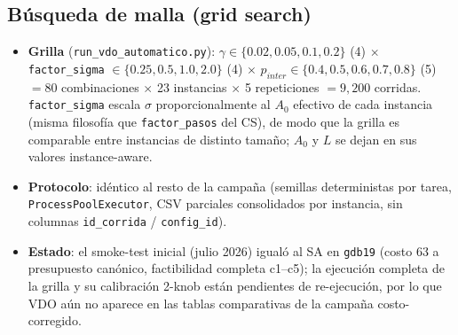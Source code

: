 \subsection{Búsqueda de malla (grid search)}
\begin{itemize}
  \item \textbf{Grilla} (\texttt{run\_vdo\_automatico.py}):
    $\gamma \in \{0.02, 0.05, 0.1, 0.2\}$ (4) $\times$
    \texttt{factor\_sigma} $\in \{0.25, 0.5, 1.0, 2.0\}$ (4) $\times$
    $p_{inter} \in \{0.4, 0.5, 0.6, 0.7, 0.8\}$ (5)
    $= 80$ combinaciones $\times$ 23 instancias $\times$ 5 repeticiones
    $= 9{,}200$ corridas. \texttt{factor\_sigma} escala $\sigma$
    proporcionalmente al $A_0$ efectivo de cada instancia (misma filosofía
    que \texttt{factor\_pasos} del CS), de modo que la grilla es comparable
    entre instancias de distinto tamaño; $A_0$ y $L$ se dejan en sus valores
    instance-aware.
  \item \textbf{Protocolo}: idéntico al resto de la campaña (semillas
    deterministas por tarea, \texttt{ProcessPoolExecutor}, CSV parciales
    consolidados por instancia, sin columnas \texttt{id\_corrida} /
    \texttt{config\_id}).
  \item \textbf{Estado}: el smoke-test inicial (julio 2026) igualó al SA en
    \texttt{gdb19} (costo 63 a presupuesto canónico, factibilidad completa
    c1--c5); la ejecución completa de la grilla y su calibración 2-knob están
    pendientes de re-ejecución, por lo que VDO aún no aparece en las tablas
    comparativas de la campaña costo-corregido.
\end{itemize}
